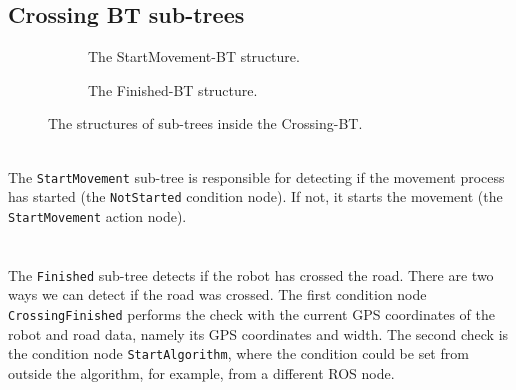     \subsection{Crossing BT sub-trees}
        \begin{figure}[ht]
            \begin{subfigure}{0.45\textwidth}
                \caption{The StartMovement-BT structure.}
                \label{fig:StartMovement-BT}
            \end{subfigure}
            \begin{subfigure}{0.54\textwidth}
                \caption{The Finished-BT structure.}
                \label{fig:Finished-BT}
            \end{subfigure}
            \caption{The structures of sub-trees inside the Crossing-BT.}
        \end{figure}
        \\
            The \texttt{StartMovement} sub-tree is responsible for detecting if the movement process has started (the \texttt{NotStarted} condition node). If not, it starts the movement (the \texttt{StartMovement} action node).\\\\
        \\
            The \texttt{Finished} sub-tree detects if the robot has crossed the road. There are two ways we can detect if the road was crossed. The first condition node \texttt{CrossingFinished} performs the check with the current GPS coordinates of the robot and road data, namely its GPS coordinates and width. The second check is the condition node \texttt{StartAlgorithm}, where the condition could be set from outside the algorithm, for example, from a different ROS node.\\
